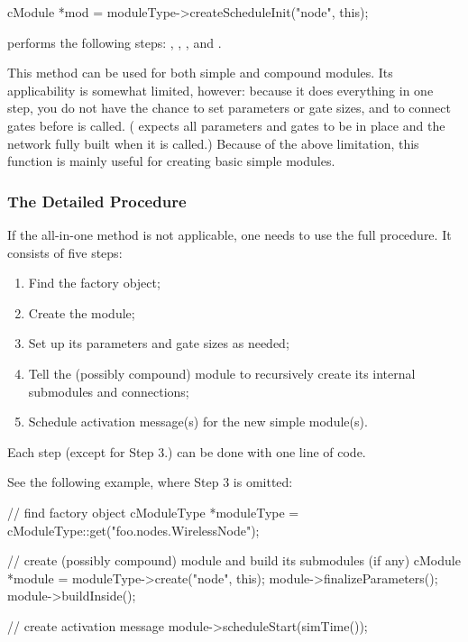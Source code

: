 \begin{cpp}
cModule *mod = moduleType->createScheduleInit("node", this);
\end{cpp}

 performs the following steps: ,
, ,
 and .

This method can be used for both simple and compound modules. Its
applicability is somewhat limited, however: because it does everything in
one step, you do not have the chance to set parameters or gate sizes, and
to connect gates before  is called.
( expects all parameters and gates to be in place and
the network fully built when it is called.) Because of the above
limitation, this function is mainly useful for creating basic simple
modules.


\subsubsection{The Detailed Procedure}

If the  all-in-one method is not applicable,
one needs to use the full procedure. It consists of five steps:

\begin{enumerate}
  \item Find the factory object;
  \item Create the module;
  \item Set up its parameters and gate sizes as needed;
  \item Tell the (possibly compound) module to recursively create
        its internal submodules and connections;
  \item Schedule activation message(s) for the new simple module(s).
\end{enumerate}

Each step (except for Step 3.) can be done with one line of code.

See the following example, where Step 3 is omitted:

\begin{cpp}
// find factory object
cModuleType *moduleType = cModuleType::get("foo.nodes.WirelessNode");

// create (possibly compound) module and build its submodules (if any)
cModule *module = moduleType->create("node", this);
module->finalizeParameters();
module->buildInside();

// create activation message
module->scheduleStart(simTime());
\end{cpp}

